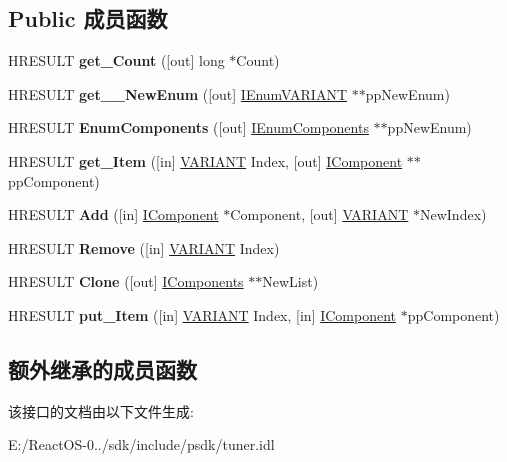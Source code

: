 \subsection*{Public 成员函数}
\begin{DoxyCompactItemize}
\item 
\mbox{\label{interface_i_components_ac710cb7ccb48749eb031cc3769776cc3}} 
H\+R\+E\+S\+U\+LT {\bfseries get\+\_\+\+Count} (\mbox{[}out\mbox{]} long $\ast$Count)
\item 
\mbox{\label{interface_i_components_a54879be769dc6f2cc265f4a074c9705e}} 
H\+R\+E\+S\+U\+LT {\bfseries get\+\_\+\+\_\+\+New\+Enum} (\mbox{[}out\mbox{]} \hyperlink{interface_i_enum_v_a_r_i_a_n_t}{I\+Enum\+V\+A\+R\+I\+A\+NT} $\ast$$\ast$pp\+New\+Enum)
\item 
\mbox{\label{interface_i_components_a05ef889e4d567f1b5b0d202f3fed3f15}} 
H\+R\+E\+S\+U\+LT {\bfseries Enum\+Components} (\mbox{[}out\mbox{]} \hyperlink{interface_i_enum_components}{I\+Enum\+Components} $\ast$$\ast$pp\+New\+Enum)
\item 
\mbox{\label{interface_i_components_a1db4010bc5c4c15b9ebb447725c3158f}} 
H\+R\+E\+S\+U\+LT {\bfseries get\+\_\+\+Item} (\mbox{[}in\mbox{]} \hyperlink{structtag_v_a_r_i_a_n_t}{V\+A\+R\+I\+A\+NT} Index, \mbox{[}out\mbox{]} \hyperlink{interface_i_component}{I\+Component} $\ast$$\ast$pp\+Component)
\item 
\mbox{\label{interface_i_components_a97c8d1fb33dc86a55b2fcfd532f79dc6}} 
H\+R\+E\+S\+U\+LT {\bfseries Add} (\mbox{[}in\mbox{]} \hyperlink{interface_i_component}{I\+Component} $\ast$Component, \mbox{[}out\mbox{]} \hyperlink{structtag_v_a_r_i_a_n_t}{V\+A\+R\+I\+A\+NT} $\ast$New\+Index)
\item 
\mbox{\label{interface_i_components_adacc7ea82f2b9e48d85a22985a9bf98a}} 
H\+R\+E\+S\+U\+LT {\bfseries Remove} (\mbox{[}in\mbox{]} \hyperlink{structtag_v_a_r_i_a_n_t}{V\+A\+R\+I\+A\+NT} Index)
\item 
\mbox{\label{interface_i_components_ac204778296a5477bd2c50138c2fc64e4}} 
H\+R\+E\+S\+U\+LT {\bfseries Clone} (\mbox{[}out\mbox{]} \hyperlink{interface_i_components}{I\+Components} $\ast$$\ast$New\+List)
\item 
\mbox{\label{interface_i_components_a25b9af8c24d1af1ae8d56817edba0a48}} 
H\+R\+E\+S\+U\+LT {\bfseries put\+\_\+\+Item} (\mbox{[}in\mbox{]} \hyperlink{structtag_v_a_r_i_a_n_t}{V\+A\+R\+I\+A\+NT} Index, \mbox{[}in\mbox{]} \hyperlink{interface_i_component}{I\+Component} $\ast$pp\+Component)
\end{DoxyCompactItemize}
\subsection*{额外继承的成员函数}


该接口的文档由以下文件生成\+:\begin{DoxyCompactItemize}
\item 
E\+:/\+React\+O\+S-\/0../sdk/include/psdk/tuner.\+idl\end{DoxyCompactItemize}
